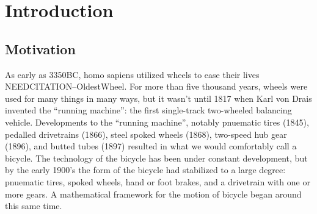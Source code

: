 \chapter{Introduction}
\section{Motivation}

As early as 3350BC, homo sapiens utilized wheels to ease
their lives NEEDCITATION--OldestWheel. For more than five thousand years, wheels were
used for many things in many ways, but it wasn't until 1817 when Karl von Drais
invented the ``running machine'': the first single-track two-wheeled balancing
vehicle. Developments to the ``running machine'', notably pnuematic tires (1845),
pedalled drivetrains (1866), steel spoked wheels (1868), two-speed hub gear
(1896), and butted tubes (1897) resulted in what we would comfortably call a
bicycle. The technology of the bicycle has been under constant development, but
by the early 1900's the form of the bicycle had stabilized to a large degree:
pnuematic tires, spoked wheels, hand or foot brakes, and a drivetrain with one
or more gears. A mathematical framework for the motion of bicycle began
around this same time\cite{Whipple1899}.
